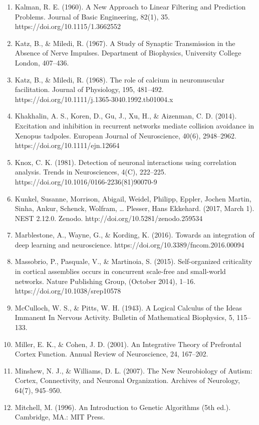 \documentclass[11pt,titlepage]{article}
\begin{document}
\begin{spacing}{1}
\begin{enumerate}
\item Kalman, R. E. (1960). A New Approach to Linear Filtering and Prediction Problems. Journal of Basic Engineering, 82(1), 35. https://doi.org/10.1115/1.3662552
\item Katz, B., \& Miledi, R. (1967). A Study of Synaptic Transmission in the Absence of Nerve Impulses. Department of Biophysics, University College London, 407–436.
\item Katz, B., \& Miledi, R. (1968). The role of calcium in neuromuscular facilitation. Journal of Physiology, 195, 481–492. https://doi.org/10.1111/j.1365-3040.1992.tb01004.x
\item Khakhalin, A. S., Koren, D., Gu, J., Xu, H., \& Aizenman, C. D. (2014). Excitation and inhibition in recurrent networks mediate collision avoidance in Xenopus tadpoles. European Journal of Neuroscience, 40(6), 2948–2962. https://doi.org/10.1111/ejn.12664
\item Knox, C. K. (1981). Detection of neuronal interactions using correlation analysis. Trends in Neurosciences, 4(C), 222–225. https://doi.org/10.1016/0166-2236(81)90070-9
\item Kunkel, Susanne, Morrison, Abigail, Weidel, Philipp, Eppler, Jochen Martin, Sinha, Ankur, Schenck, Wolfram, … Plesser, Hans Ekkehard. (2017, March 1). NEST 2.12.0. Zenodo. http://doi.org/10.5281/zenodo.259534
\item Marblestone, A., Wayne, G., \& Kording, K. (2016). Towards an integration of deep learning and neuroscience. https://doi.org/10.3389/fncom.2016.00094
\item Massobrio, P., Pasquale, V., \& Martinoia, S. (2015). Self-organized criticality in cortical assemblies occurs in concurrent scale-free and small-world networks. Nature Publishing Group, (October 2014), 1–16. https://doi.org/10.1038/srep10578
\item McCulloch, W. S., \& Pitts, W. H. (1943). A Logical Calculus of the Ideas Immanent In Nervous Activity. Bulletin of Mathematical Biophysics, 5, 115–133.
\item Miller, E. K., \& Cohen, J. D. (2001). An Integrative Theory of Prefrontal Cortex Function. Annual Review of Neuroscience, 24, 167–202.
\item Minshew, N. J., \& Williams, D. L. (2007). The New Neurobiology of Autism: Cortex, Connectivity, and Neuronal Organization. Archives of Neurology, 64(7), 945–950.
\item Mitchell, M. (1996). An Introduction to Genetic Algorithms (5th ed.). Cambridge, MA.: MIT Press.

\end{enumerate}
\end{spacing}
\end{document}
